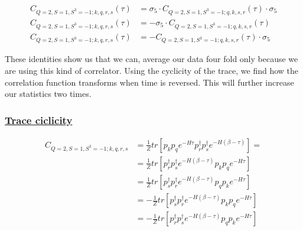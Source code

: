 \begin{equation}
  \begin{aligned}
    C_{Q=2,S=1,S^3=-1;k,q,r,s} (\tau) &= \sigma_5\cdot C_{Q=2,S=1,S^3=-1;q,k,s,r} (\tau)\cdot\sigma_5\\
    C_{Q=2,S=1,S^3=-1;k,q,r,s} (\tau) &= -\sigma_5\cdot C_{Q=2,S=1,S^3=-1;q,k,s,r} (\tau)\\
    C_{Q=2,S=1,S^3=-1;k,q,r,s} (\tau) &= - C_{Q=2,S=1,S^3=-1;q,k,s,r} (\tau)\cdot\sigma_5
  \end{aligned}
\end{equation}

These identities show us that we can, average our data four fold only because we are using this kind of correlator. Using the cyclicity of the trace, we find how the correlation function transforms when time is reversed. This will further increase our statistics two times.

\subsubsection{\underline{Trace ciclicity}}

\begin{equation}
  \begin{aligned}
    C_{Q=2,S=1,S^3=-1;k,q,r,s} &= \frac{1}{Z}tr\left[p_kp_qe^{-H\tau}p^\dagger_rp^\dagger_se^{-H\left(\beta-\tau\right)}\right] =\\
    &= \frac{1}{Z}tr\left[p^\dagger_rp^\dagger_se^{-H\left(\beta-\tau\right)}p_kp_qe^{-H\tau}\right] \\
    &= \frac{1}{Z}tr\left[p^\dagger_sp^\dagger_re^{-H\left(\beta-\tau\right)}p_qp_ke^{-H\tau}\right] \\
    &= - \frac{1}{Z}tr\left[p^\dagger_sp^\dagger_re^{-H\left(\beta-\tau\right)}p_kp_qe^{-H\tau}\right] \\
    &= - \frac{1}{Z}tr\left[p^\dagger_rp^\dagger_se^{-H\left(\beta-\tau\right)}p_qp_ke^{-H\tau}\right]
  \end{aligned}
\end{equation}

